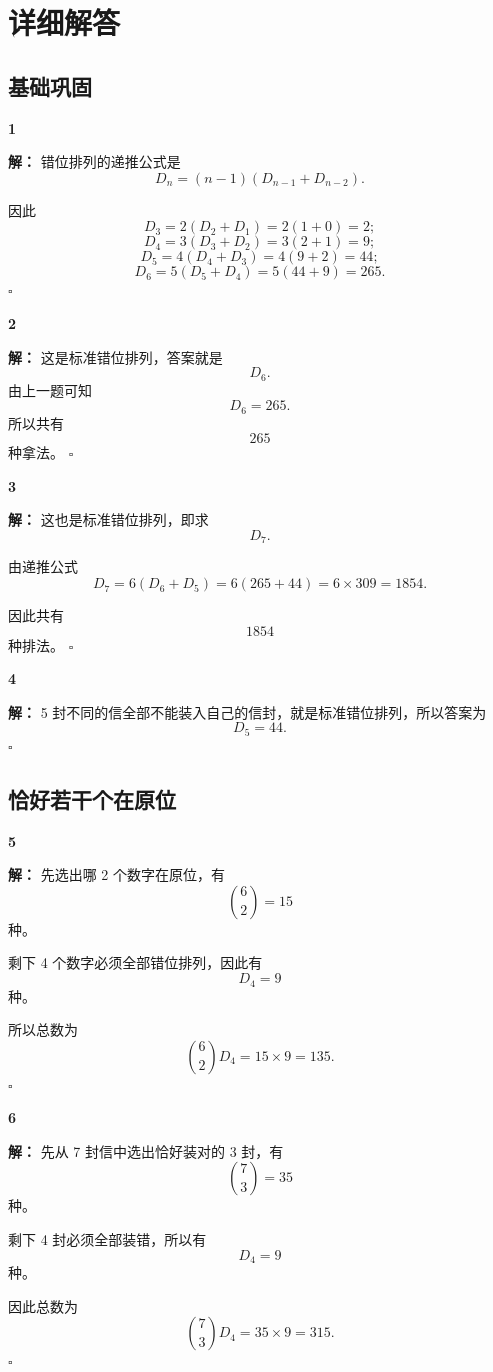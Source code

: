 \documentclass[11pt,a4paper,fontset=fandol]{ctexart}
\theoremstyle{formalexample}
\newenvironment{solution}{\par\noindent\textbf{解：}}{\hfill$\square$\par}
\begin{document}
\newpage
\appendix
\section{详细解答}

\subsection*{基础巩固}

\textbf{1}\begin{solution}
错位排列的递推公式是
\[
D_n=(n-1)(D_{n-1}+D_{n-2}).
\]

因此
\[
D_3=2(D_2+D_1)=2(1+0)=2;
\]
\[
D_4=3(D_3+D_2)=3(2+1)=9;
\]
\[
D_5=4(D_4+D_3)=4(9+2)=44;
\]
\[
D_6=5(D_5+D_4)=5(44+9)=265.
\]
\end{solution}

\textbf{2}\begin{solution}
这是标准错位排列，答案就是
\[
D_6.
\]
由上一题可知
\[
D_6=265.
\]
所以共有
\[
265
\]
种拿法。
\end{solution}

\textbf{3}\begin{solution}
这也是标准错位排列，即求
\[
D_7.
\]

由递推公式
\[
D_7=6(D_6+D_5)=6(265+44)=6\times 309=1854.
\]

因此共有
\[
1854
\]
种排法。
\end{solution}

\textbf{4}\begin{solution}
5 封不同的信全部不能装入自己的信封，就是标准错位排列，所以答案为
\[
D_5=44.
\]
\end{solution}

\subsection*{恰好若干个在原位}

\textbf{5}\begin{solution}
先选出哪 2 个数字在原位，有
\[
\binom{6}{2}=15
\]
种。

剩下 4 个数字必须全部错位排列，因此有
\[
D_4=9
\]
种。

所以总数为
\[
\binom{6}{2}D_4=15\times 9=135.
\]
\end{solution}

\textbf{6}\begin{solution}
先从 7 封信中选出恰好装对的 3 封，有
\[
\binom{7}{3}=35
\]
种。

剩下 4 封必须全部装错，所以有
\[
D_4=9
\]
种。

因此总数为
\[
\binom{7}{3}D_4=35\times 9=315.
\]
\end{solution}
\end{document}
